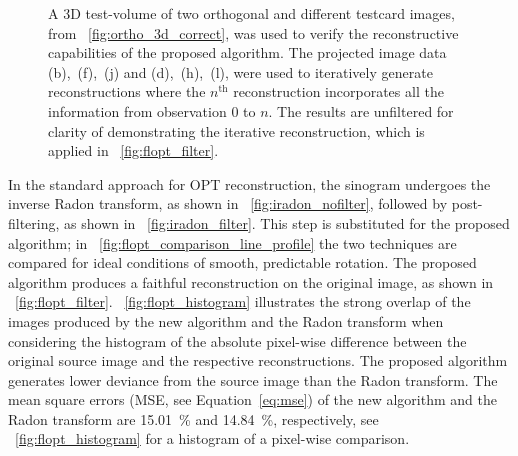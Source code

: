 \documentclass{osa-article}
\begin{document}
\begin{figure}
\begin{subfigure}[t]{0.2\linewidth}
  \end{subfigure}
  \caption[A 3D test-volume of two orthogonal and different testcard images, was used to verify the reconstructive capabilities of the proposed algorithm]{
    A 3D test-volume of two orthogonal and different testcard images, from \figurename~\ref{fig:ortho_3d_correct}, was used to verify the reconstructive capabilities of the proposed algorithm.
    The projected image data (b),~(f),~(j) and (d),~(h),~(l), were used to iteratively generate reconstructions where the \(n^\text{th}\) reconstruction incorporates all the information from observation 0 to \(n\).
    The results are unfiltered for clarity of demonstrating the iterative reconstruction, which is applied in \figurename~\ref{fig:flopt_filter}.
  }\label{fig:recon_iterative}
\end{figure}

In the standard approach for OPT reconstruction, the sinogram undergoes the inverse Radon transform, as shown in \figurename~\ref{fig:iradon_nofilter}, followed by post-filtering, as shown in \figurename~\ref{fig:iradon_filter}.
This step is substituted for the proposed algorithm; in \figurename~\ref{fig:flopt_comparison_line_profile} the two techniques are compared for ideal conditions of smooth, predictable rotation.
The proposed algorithm produces %
a faithful reconstruction on the original image, as shown in \figurename~\ref{fig:flopt_filter}. %
\figurename~\ref{fig:flopt_histogram} illustrates the strong overlap of the images produced by the new algorithm and the Radon transform when considering the histogram of the absolute pixel-wise difference between the original source image and the respective reconstructions.
The proposed algorithm generates lower deviance from the source image than the Radon transform.
The mean square errors (MSE, see Equation~\eqref{eq:mse}) of the new algorithm and the Radon transform are \SI{15.01}{\percent} and \SI{14.84}{\percent}, respectively, see \figurename~\ref{fig:flopt_histogram} for a histogram of a pixel-wise comparison.
\end{document}
